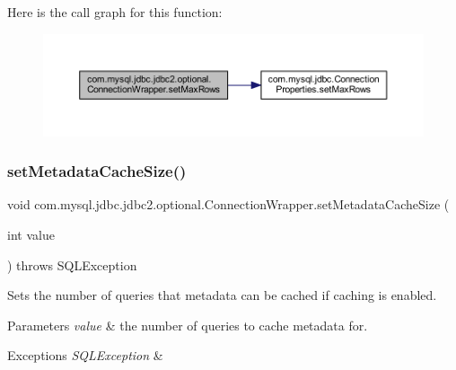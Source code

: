 Here is the call graph for this function\+:
\nopagebreak
\begin{figure}[H]
\begin{center}
\leavevmode
\includegraphics[width=350pt]{classcom_1_1mysql_1_1jdbc_1_1jdbc2_1_1optional_1_1_connection_wrapper_a21b7e7ac26548d9266485dce22f5af21_cgraph}
\end{center}
\end{figure}
\mbox{\label{classcom_1_1mysql_1_1jdbc_1_1jdbc2_1_1optional_1_1_connection_wrapper_aa2b3fbef9bed38d8dd555e8f0f7c3598}} 
\subsubsection{\texorpdfstring{set\+Metadata\+Cache\+Size()}{setMetadataCacheSize()}}
{\footnotesize\ttfamily void com.\+mysql.\+jdbc.\+jdbc2.\+optional.\+Connection\+Wrapper.\+set\+Metadata\+Cache\+Size (\begin{DoxyParamCaption}\item[{int}]{value }\end{DoxyParamCaption}) throws S\+Q\+L\+Exception}

Sets the number of queries that metadata can be cached if caching is enabled.


\begin{DoxyParams}{Parameters}
{\em value} & the number of queries to cache metadata for. \\
\hline
\end{DoxyParams}

\begin{DoxyExceptions}{Exceptions}
{\em S\+Q\+L\+Exception} & \\
\hline
\end{DoxyExceptions}



